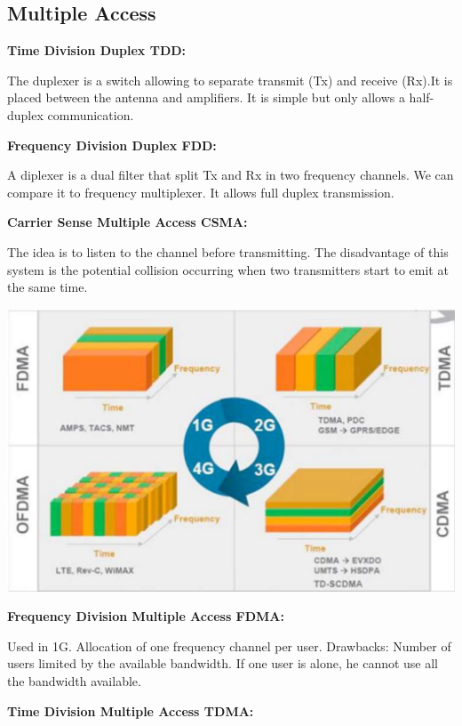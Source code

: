 \subsection*{Multiple Access}
\textbf{Time Division Duplex TDD:}

The duplexer is a switch allowing to
separate transmit (Tx) and receive (Rx).It is placed between the antenna and
amplifiers. It is simple but only allows a half-duplex communication.

\textbf{Frequency Division Duplex FDD:}

A diplexer is a dual filter that split Tx and Rx in two
frequency channels. We can compare it to frequency multiplexer. It allows full duplex transmission.

\textbf{Carrier Sense Multiple Access CSMA:}

The idea is to listen to the channel before transmitting.
The disadvantage of this system is the potential collision occurring when two transmitters
start to emit at the same time.

\includegraphics[width=\columnwidth]{images/multiple_access_comparison.png}

\textbf{Frequency Division Multiple Access FDMA:}

Used in 1G. Allocation of
one frequency channel per user. Drawbacks: Number of users limited by the available bandwidth.
If one user is alone, he cannot use all the bandwidth available.

\textbf{Time Division Multiple Access TDMA:}

